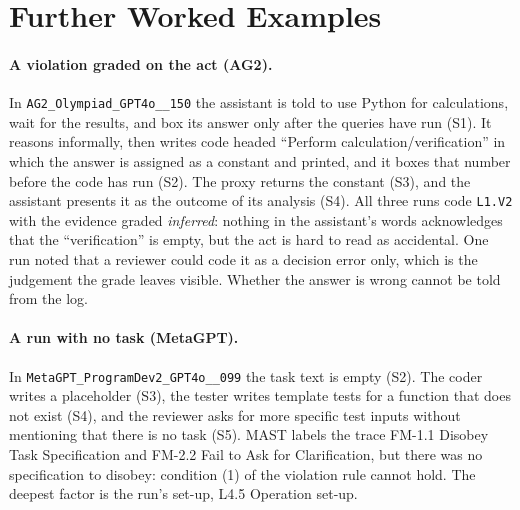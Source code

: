 \documentclass[10pt,a4paper]{article}
\newcommand{\code}[1]{\texttt{#1}}
\begin{document}
\section{Further Worked Examples}
\label{app:cases}

\paragraph{A violation graded on the act (AG2).} In
\code{AG2\_Olympiad\_GPT4o\_\_150} the assistant is told to use Python for
calculations, wait for the results, and box its answer only after the queries have
run (S1). It reasons informally, then writes code headed ``Perform
calculation/verification'' in which the answer is assigned as a constant and
printed, and it boxes that number before the code has run (S2). The proxy returns
the constant (S3), and the assistant presents it as the outcome of its analysis
(S4). All three runs code \code{L1.V2} with the evidence graded \emph{inferred}:
nothing in the assistant's words acknowledges that the ``verification'' is empty,
but the act is hard to read as accidental. One run noted that a reviewer could
code it as a decision error only, which is the judgement the grade leaves visible.
Whether the answer is wrong cannot be told from the log.

\paragraph{A run with no task (MetaGPT).} In
\code{MetaGPT\_ProgramDev2\_GPT4o\_\_099} the task text is empty (S2). The coder
writes a placeholder (S3), the tester writes template tests for a function that
does not exist (S4), and the reviewer asks for more specific test inputs without
mentioning that there is no task (S5). MAST labels the trace FM-1.1 Disobey Task
Specification and FM-2.2 Fail to Ask for Clarification, but there was no
specification to disobey: condition (1) of the violation rule cannot hold. The
deepest factor is the run's set-up, L4.5 Operation set-up.
\end{document}
